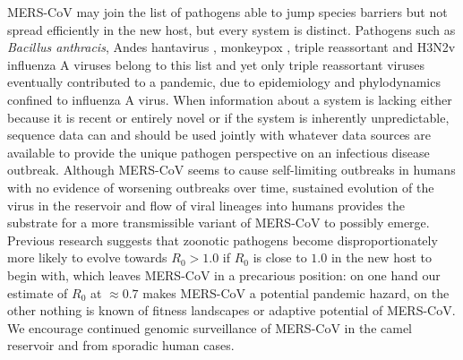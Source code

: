 \documentclass[9pt,lineno]{elife}
\begin{document}
MERS-CoV may join the list of pathogens able to jump species barriers but not spread efficiently in the new host, but every system is distinct.
Pathogens such as \textit{Bacillus anthracis}, Andes hantavirus \citep{martinez_person--person_2005}, monkeypox \citep{reed_detection_2004}, triple reassortant and H3N2v influenza A viruses \citep{shinde_triple-reassortant_2009,epperson_human_2013} belong to this list and yet only triple reassortant viruses eventually contributed to a pandemic, due to epidemiology and phylodynamics confined to influenza A virus.
When information about a system is lacking either because it is recent or entirely novel or if the system is inherently unpredictable, sequence data can and should be used jointly with whatever data sources are available to provide the unique pathogen perspective on an infectious disease outbreak.
Although MERS-CoV seems to cause self-limiting outbreaks in humans with no evidence of worsening outbreaks over time, sustained evolution of the virus in the reservoir and flow of viral lineages into humans provides the substrate for a more transmissible variant of MERS-CoV to possibly emerge.
Previous research \citep{antia_role_2003} suggests that zoonotic pathogens become disproportionately more likely to evolve towards $R_{0}>1.0$ if $R_{0}$ is close to $1.0$ in the new host to begin with, which leaves MERS-CoV in a precarious position: on one hand our estimate of $R_{0}$ at $\approx 0.7$ makes MERS-CoV a potential pandemic hazard, on the other nothing is known of fitness landscapes or adaptive potential of MERS-CoV.
We encourage continued genomic surveillance of MERS-CoV in the camel reservoir and from sporadic human cases.

\end{document}
